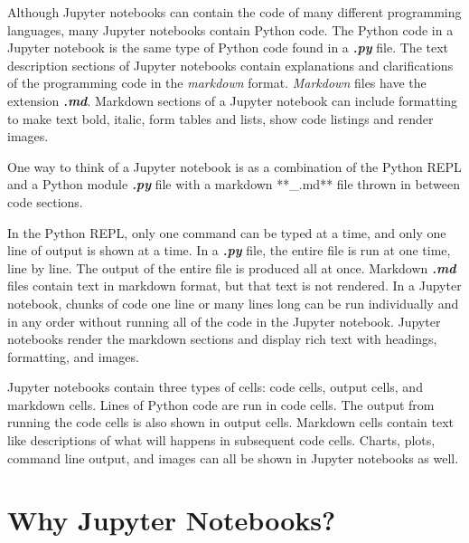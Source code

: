\documentclass{book}
\begin{document}
    
        Although Jupyter notebooks can contain the code of many different
programming languages, many Jupyter notebooks contain Python code. The
Python code in a Jupyter notebook is the same type of Python code found
in a \textbf{\emph{.py}} file. The text description sections of Jupyter
notebooks contain explanations and clarifications of the programming
code in the \emph{markdown} format. \emph{Markdown} files have the
extension \textbf{\emph{.md}}. Markdown sections of a Jupyter notebook
can include formatting to make text bold, italic, form tables and lists,
show code listings and render images.
    




    
        One way to think of a Jupyter notebook is as a combination of the Python
REPL and a Python module \textbf{\emph{.py}} file with a markdown
**\_.md** file thrown in between code sections.

In the Python REPL, only one command can be typed at a time, and only
one line of output is shown at a time. In a \textbf{\emph{.py}} file,
the entire file is run at one time, line by line. The output of the
entire file is produced all at once. Markdown \textbf{\emph{.md}} files
contain text in markdown format, but that text is not rendered. In a
Jupyter notebook, chunks of code one line or many lines long can be run
individually and in any order without running all of the code in the
Jupyter notebook. Jupyter notebooks render the markdown sections and
display rich text with headings, formatting, and images.
    




    
        Jupyter notebooks contain three types of cells: code cells, output
cells, and markdown cells. Lines of Python code are run in code cells.
The output from running the code cells is also shown in output cells.
Markdown cells contain text like descriptions of what will happens in
subsequent code cells. Charts, plots, command line output, and images
can all be shown in Jupyter notebooks as well.
    




    
        \hypertarget{why-jupyter-notebooks}{%
\section{Why Jupyter Notebooks?}\label{why-jupyter-notebooks}}
    
\end{document}
